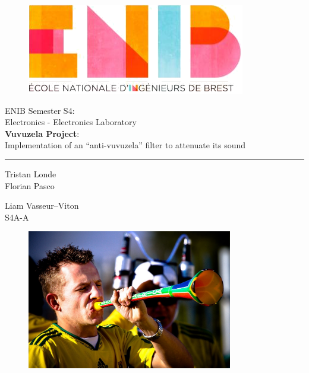 \documentclass[a4paper, twoside]{article} %
\begin{document}
\begin{figure}[t]
	\begin{minipage}[b]{0.4\linewidth}
		\raggedright \includegraphics[scale=0.5]{enib.jpg}
	\end{minipage}\hfill
\end{figure}
\begin{titlepage}
\begin{center}
ENIB Semester S4: \\
Electronics - Electronics Laboratory\\
\vspace{2cm}
\huge{\textbf{Vuvuzela Project}: \\
Implementation of an “anti-vuvuzela” filter to attenuate its sound}\\
\end{center}
\begin{center}
\rule{\linewidth}{1pt}
\end{center}
\begin{minipage}[t]{0.47\textwidth}
	{\large Tristan Londe}\\
	{\large Florian Pasco}
\end{minipage}\hfill
\begin{minipage}[t]{0.47\textwidth}\raggedleft
	{\large Liam Vasseur--Viton}\\
	{\large S4A-A}
\end{minipage}
\vspace{2.5cm}
\begin{figure}[H]
	\centering \includegraphics[width=0.8\textwidth]{guardpage.jpg}
\end{figure}
\vspace{0.3cm}
\end{titlepage}

\tableofcontents
\listoffigures

\newpage

\end{document}
